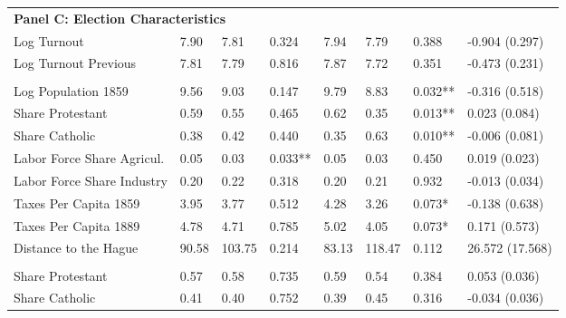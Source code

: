\begin{table}[!h]
{\begin{threeparttable}
\begin{tabular}[t]{llllllll}
\multicolumn{8}{l}{\textbf{Panel C: Election Characteristics}}\\
\hspace{1em}Log Turnout & \num{7.90} & \num{7.81} & 0.324 & \num{7.94} & \num{7.79} & 0.388 & -0.904 (0.297)\\
\hspace{1em}Log Turnout Previous & \num{7.81} & \num{7.79} & 0.816 & \num{7.87} & \num{7.72} & 0.351 & -0.473 (0.231)\\
\addlinespace[0.3em]
\multicolumn{8}{l}{\textbf{Panel D: Birthplace Characteristics}}\\
\hspace{1em}Log Population 1859 & \num{9.56} & \num{9.03} & 0.147 & \num{9.79} & \num{8.83} & 0.032** & -0.316 (0.518)\\
\hspace{1em}Share Protestant & \num{0.59} & \num{0.55} & 0.465 & \num{0.62} & \num{0.35} & 0.013** & 0.023 (0.084)\\
\hspace{1em}Share Catholic & \num{0.38} & \num{0.42} & 0.440 & \num{0.35} & \num{0.63} & 0.010** & -0.006 (0.081)\\
\hspace{1em}Labor Force Share Agricul. & \num{0.05} & \num{0.03} & 0.033** & \num{0.05} & \num{0.03} & 0.450 & 0.019 (0.023)\\
\hspace{1em}Labor Force Share Industry & \num{0.20} & \num{0.22} & 0.318 & \num{0.20} & \num{0.21} & 0.932 & -0.013 (0.034)\\
\hspace{1em}Taxes Per Capita 1859 & \num{3.95} & \num{3.77} & 0.512 & \num{4.28} & \num{3.26} & 0.073* & -0.138 (0.638)\\
\hspace{1em}Taxes Per Capita 1889 & \num{4.78} & \num{4.71} & 0.785 & \num{5.02} & \num{4.05} & 0.073* & 0.171 (0.573)\\
\hspace{1em}Distance to the Hague & \num{90.58} & \num{103.75} & 0.214 & \num{83.13} & \num{118.47} & 0.112 & 26.572 (17.568)\\
\addlinespace[0.3em]
\multicolumn{8}{l}{\textbf{Panel E: District Characteristics}}\\
\hspace{1em}Share Protestant & \num{0.57} & \num{0.58} & 0.735 & \num{0.59} & \num{0.54} & 0.384 & 0.053 (0.036)\\
\hspace{1em}Share Catholic & \num{0.41} & \num{0.40} & 0.752 & \num{0.39} & \num{0.45} & 0.316 & -0.034 (0.036)\\

\end{tabular}
\end{threeparttable}}
\end{table}
